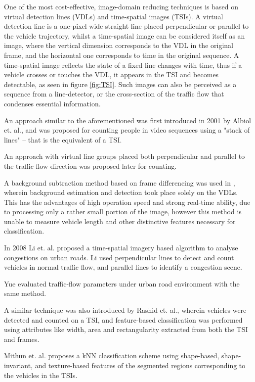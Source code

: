 One of the most cost-effective, image-domain reducing techniques is based on virtual detection lines (VDLs) and time-spatial images (TSIs).
A virtual detection line is a one-pixel wide straight line placed perpendicular or parallel to the vehicle trajectory, whilst a time-spatial image can be considered itself as an image, where the vertical dimension corresponds to the VDL in the original frame, and the horizontal one corresponds to time in the original sequence.
A time-spatial image reflects the state of a fixed line changes with time, thus if a vehicle crosses or touches the VDL, it appears in the TSI and becomes detectable, as seen in figure \ref{fig:TSI}.
Such images can also be perceived as a sequence from a line-detector, or the cross-section of the traffic flow that condenses essential information. 

An approach similar to the aforementioned was first introduced in 2001 by Albiol et. al., and was proposed for counting people in video sequences using a "stack of lines" -- that is the equivalent of a TSI\cite{Albiol2001}.

An approach with virtual line groups placed both perpendicular and parallel to the traffic flow direction was proposed later for counting\cite{Anan2006,Wu2007}.

A background subtraction method based on frame differencing was used in \cite{Anan2006, Wu2007}, wherein background estimation and detection took place solely on the VDLs.
This has the advantages of high operation speed and strong real-time ability, due to processing only a rather small portion of the image, however this method is unable to measure vehicle length and other distinctive features necessary for classification.

In 2008 Li et. al. proposed a time-spatial imagery based algorithm to analyse congestions on urban roads.
Li used perpendicular lines to detect and count vehicles in normal traffic flow, and parallel lines to identify a congestion scene\cite{Li2008}.

Yue evaluated traffic-flow parameters under urban road environment with the same method\cite{Yue2009}.

A similar technique was also introduced by Rashid et. al., wherein vehicles were detected and counted on a TSI, and feature-based classification was performed using attributes like width, area and rectangularity extracted from both the TSI and frames\cite{Rashid2010}.

Mithun et. al. proposes a kNN classification scheme using shape-based, shape-invariant, and texture-based features of the segmented regions corresponding to the vehicles in the TSIs\cite{Mithun2012a}.

